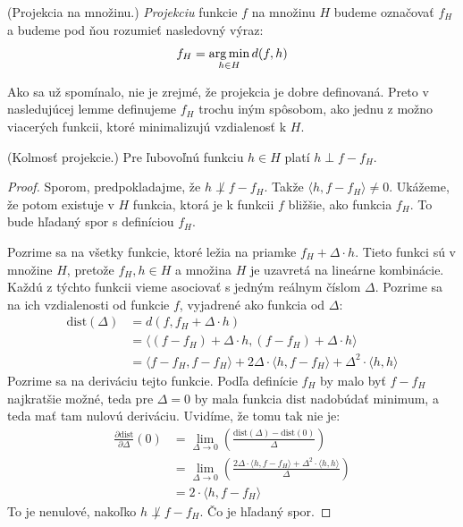 \begin{definition}
  (Projekcia na množinu.) \emph{Projekciu} funkcie $f$ na množinu $H$
  budeme označovať $f_H$ a budeme pod ňou rozumieť nasledovný výraz:
  $$f_H = \operatorname*{arg\,min}_{h \in H} d(f, h)$$
\end{definition}

\begin{remark}
  Ako sa už spomínalo, nie je zrejmé, že projekcia je dobre definovaná.
  Preto v nasledujúcej lemme definujeme $f_H$ trochu iným spôsobom, ako
  jednu z možno viacerých funkcii, ktoré minimalizujú vzdialenosť k $H$.
\end{remark}

\begin{lemma} \label{lem:projperp}
  (Kolmosť projekcie.) Pre ľubovoľnú funkciu $h \in H$ platí $h \perp f - f_H$.
\end{lemma}
\begin{proof}
  Sporom, predpokladajme, že $h \not\perp f - f_H$. Takže
  $\langle h, f - f_H \rangle \neq 0$. Ukážeme, že potom existuje
  v $H$ funkcia, ktorá je k funkcii $f$ bližšie, ako funkcia $f_H$.
  To bude hľadaný spor s definíciou $f_H$.
  
  Pozrime sa na všetky funkcie, ktoré ležia na priamke
  $f_H + \Delta \cdot h$. Tieto funkci sú v množine $H$, pretože
  $f_H, h \in H$ a množina $H$ je uzavretá na lineárne kombinácie.
  Každú z týchto funkcii vieme asociovať s jedným reálnym číslom
  $\Delta$. Pozrime sa na ich vzdialenosti od funkcie $f$, vyjadrené
  ako funkcia od $\Delta$:
  \begin{align}
    \text{dist}(\Delta)
      &= d(f, f_H + \Delta \cdot h) \\
      &= \langle (f - f_H) + \Delta \cdot h, (f - f_H) + \Delta \cdot h \rangle \\
      &= \langle f - f_H, f - f_H \rangle + 2\Delta \cdot \langle h, f - f_H \rangle + \Delta^2 \cdot \langle h, h \rangle
  \end{align}
  Pozrime sa na deriváciu tejto funkcie. Podľa definície $f_H$ by
  malo byť $f - f_H$ najkratšie možné, teda pre $\Delta = 0$ by mala
  funkcia $\text{dist}$ nadobúdať minimum, a teda mať tam nulovú
  deriváciu. Uvidíme, že tomu tak nie je:
  \begin{align}
    \frac{\partial \text{dist}}{\partial \Delta} \left( 0 \right)
      &= \lim_{\Delta \to 0} \left( \frac{\text{dist}(\Delta) - \text{dist}(0)}{\Delta} \right) \\
      &= \lim_{\Delta \to 0} \left( \frac{2\Delta \cdot \langle h, f - f_H \rangle + \Delta^2 \cdot \langle h, h \rangle}{\Delta} \right) \\
      &= 2 \cdot \langle h, f - f_H \rangle
  \end{align}
  To je nenulové, nakoľko $h \not \perp f - f_H$. Čo je hľadaný spor.
\end{proof}

